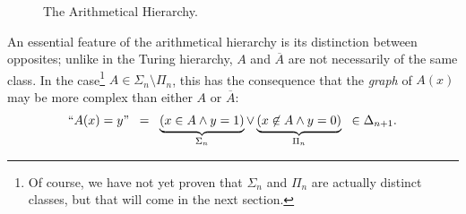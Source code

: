 \documentclass{amsart}
\begin{document}
	
	
	\begin{figure}[h]
		\begin{center}
		\end{center}
		\caption{The Arithmetical Hierarchy.}
	\end{figure}
	
	An essential feature of the arithmetical hierarchy is its distinction between opposites; unlike in the Turing hierarchy, $A$ and $\overline{A}$ are not necessarily of the same class. In the case\footnote{Of course, we have not yet proven that $\Sigma_n$ and $\Pi_n$ are actually distinct classes, but that will come in the next section.} $A\in \Sigma_{n}\setminus \Pi_n$, this has the consequence that the \textit{graph} of $A(x)$ may be more complex than either $A$ or $\overline{A}$:
	$$
	``A(x) = y" \;\; = \;\; \underbrace{(x\in A\^y=1)}_{\Sigma_n}\vee\underbrace{(x\not\in A \^ y=0)}_{\Pi_n} \;\; \in \Delta_{n+1}.
	$$
	
\end{document}
